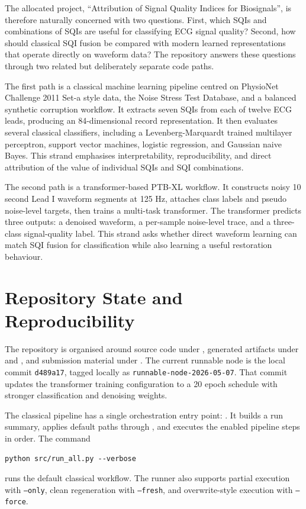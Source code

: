\documentclass[11pt,a4paper]{article}
\begin{document}
The allocated project, ``Attribution of Signal Quality Indices for Biosignals'', is therefore naturally concerned with two questions. First, which SQIs and combinations of SQIs are useful for classifying ECG signal quality? Second, how should classical SQI fusion be compared with modern learned representations that operate directly on waveform data? The repository answers these questions through two related but deliberately separate code paths.

The first path is a classical machine learning pipeline centred on PhysioNet Challenge 2011 Set-a style data, the Noise Stress Test Database, and a balanced synthetic corruption workflow. It extracts seven SQIs from each of twelve ECG leads, producing an 84-dimensional record representation. It then evaluates several classical classifiers, including a Levenberg-Marquardt trained multilayer perceptron, support vector machines, logistic regression, and Gaussian naive Bayes. This strand emphasises interpretability, reproducibility, and direct attribution of the value of individual SQIs and SQI combinations.

The second path is a transformer-based PTB-XL workflow. It constructs noisy 10 second Lead I waveform segments at 125 Hz, attaches class labels and pseudo noise-level targets, then trains a multi-task transformer. The transformer predicts three outputs: a denoised waveform, a per-sample noise-level trace, and a three-class signal-quality label. This strand asks whether direct waveform learning can match SQI fusion for classification while also learning a useful restoration behaviour.

\section{Repository State and Reproducibility}

The repository is organised around source code under , generated artifacts under  and , and submission material under . The current runnable node is the local commit \texttt{d489a17}, tagged locally as \texttt{runnable-node-2026-05-07}. That commit updates the transformer training configuration to a 20 epoch schedule with stronger classification and denoising weights.

The classical pipeline has a single orchestration entry point: . It builds a run summary, applies default paths through , and executes the enabled pipeline steps in order. The command
\begin{verbatim}
python src/run_all.py --verbose
\end{verbatim}
runs the default classical workflow. The runner also supports partial execution with \texttt{--only}, clean regeneration with \texttt{--fresh}, and overwrite-style execution with \texttt{--force}.
\end{document}

